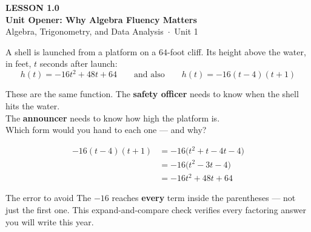 \documentclass[aspectratio=169, 11pt]{beamer}
\begin{document}
{
\begin{frame}[plain]
  \vspace{2.8cm}\hspace{0.55cm}%
  \begin{minipage}{0.9\textwidth}
    {\color{goldacc}\bfseries\small LESSON 1.0}\\[0.5cm]
    {\color{white}\bfseries\LARGE Unit Opener: Why Algebra Fluency Matters}\\[1.2cm]
    {\color{mistmid}\small Algebra, Trigonometry, and Data Analysis~$\cdot$~Unit 1}
  \end{minipage}
\end{frame}
}

\begin{frame}[t, plain]
  A shell is launched from a platform on a $64$-foot cliff. Its height above the water,
  in feet, $t$ seconds after launch:
  \[ h(t) = -16t^2+48t+64 \qquad\text{and also}\qquad h(t) = -16(t-4)(t+1) \]
  \begin{block}{These are the same function.}
    The \textbf{safety officer} needs to know when the shell hits the water.\\
    The \textbf{announcer} needs to know how high the platform is.\\[2pt]
    Which form would you hand to each one --- and why?
  \end{block}
\end{frame}

\begin{frame}[t, plain]
  \[
  \begin{aligned}
    -16(t-4)(t+1) &= -16\big(t^2+t-4t-4\big) \\
                  &= -16\big(t^2-3t-4\big) \\
                  &= -16t^2+48t+64
  \end{aligned}
  \]
  \begin{block}{The error to avoid}
    The $-16$ reaches \textbf{every} term inside the parentheses --- not just the first one.
    This expand-and-compare check verifies every factoring answer you will write this year.
  \end{block}
\end{frame}
\end{document}
